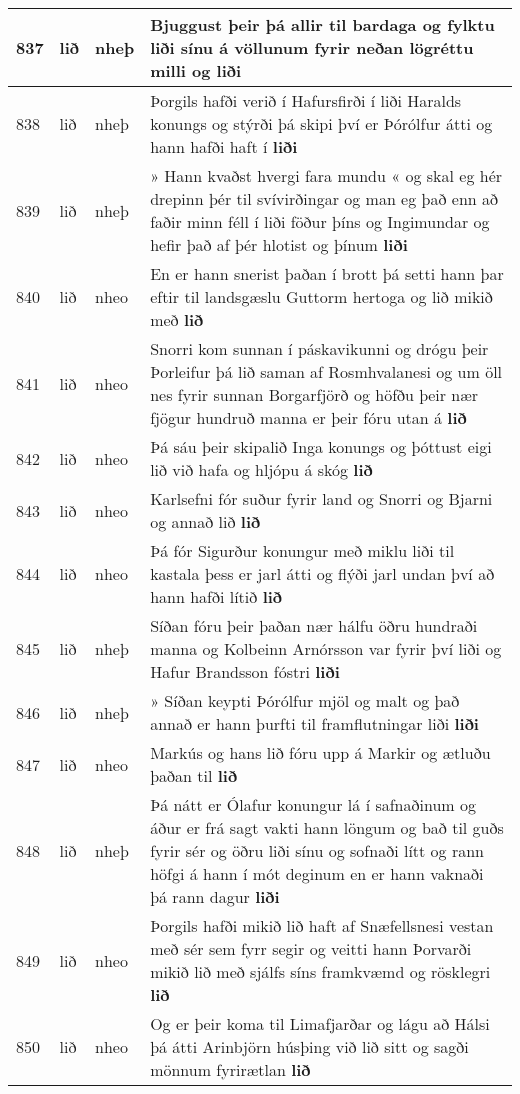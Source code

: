 \documentclass{article}
\begin{document}
\begin{longtable}{p{1cm}|p{1cm}|p{1cm}|p{13cm}}
\hline
837&lið&nheþ&Bjuggust þeir þá allir til bardaga og fylktu liði sínu á völlunum fyrir neðan lögréttu milli og \textbf{liði} \\
\hline
838&lið&nheþ&Þorgils hafði verið í Hafursfirði í liði Haralds konungs og stýrði þá skipi því er Þórólfur átti og hann hafði haft í \textbf{liði} \\
\hline
839&lið&nheþ&» Hann kvaðst hvergi fara mundu « og skal eg hér drepinn þér til svívirðingar og man eg það enn að faðir minn féll í liði föður þíns og Ingimundar og hefir það af þér hlotist og þínum \textbf{liði} \\
\hline
840&lið&nheo&En er hann snerist þaðan í brott þá setti hann þar eftir til landsgæslu Guttorm hertoga og lið mikið með \textbf{lið} \\
\hline
841&lið&nheo&Snorri kom sunnan í páskavikunni og drógu þeir Þorleifur þá lið saman af Rosmhvalanesi og um öll nes fyrir sunnan Borgarfjörð og höfðu þeir nær fjögur hundruð manna er þeir fóru utan á \textbf{lið} \\
\hline
842&lið&nheo&Þá sáu þeir skipalið Inga konungs og þóttust eigi lið við hafa og hljópu á skóg \textbf{lið} \\
\hline
843&lið&nheo&Karlsefni fór suður fyrir land og Snorri og Bjarni og annað lið \textbf{lið} \\
\hline
844&lið&nheo&Þá fór Sigurður konungur með miklu liði til kastala þess er jarl átti og flýði jarl undan því að hann hafði lítið \textbf{lið} \\
\hline
845&lið&nheþ&Síðan fóru þeir þaðan nær hálfu öðru hundraði manna og Kolbeinn Arnórsson var fyrir því liði og Hafur Brandsson fóstri \textbf{liði} \\
\hline
846&lið&nheþ&» Síðan keypti Þórólfur mjöl og malt og það annað er hann þurfti til framflutningar liði \textbf{liði} \\
\hline
847&lið&nheo&Markús og hans lið fóru upp á Markir og ætluðu þaðan til \textbf{lið} \\
\hline
848&lið&nheþ&Þá nátt er Ólafur konungur lá í safnaðinum og áður er frá sagt vakti hann löngum og bað til guðs fyrir sér og öðru liði sínu og sofnaði lítt og rann höfgi á hann í mót deginum en er hann vaknaði þá rann dagur \textbf{liði} \\
\hline
849&lið&nheo&Þorgils hafði mikið lið haft af Snæfellsnesi vestan með sér sem fyrr segir og veitti hann Þorvarði mikið lið með sjálfs síns framkvæmd og rösklegri \textbf{lið} \\
\hline
850&lið&nheo&Og er þeir koma til Limafjarðar og lágu að Hálsi þá átti Arinbjörn húsþing við lið sitt og sagði mönnum fyrirætlan \textbf{lið} \\

\end{longtable}
\end{document}
